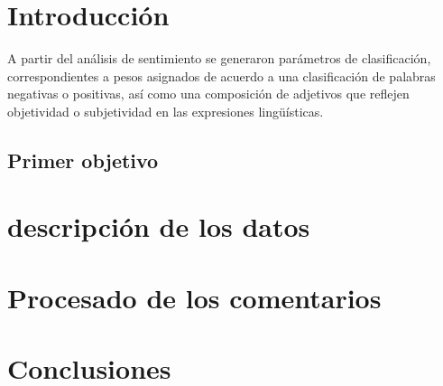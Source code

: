 \chapter{Introducción}

A partir del análisis de sentimiento se generaron parámetros de clasificación, correspondientes a pesos asignados de acuerdo a una clasificación de palabras negativas o positivas, así como una composición de adjetivos que reflejen objetividad o subjetividad en las expresiones lingüísticas.\\

 

\section{Primer objetivo}
 

\chapter{descripción de los datos}

\chapter{Procesado de los comentarios}


\chapter{Conclusiones}

